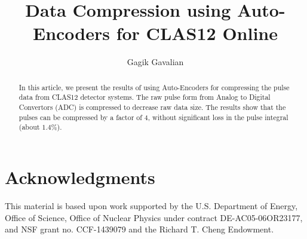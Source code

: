 \documentclass[preprint,12pt]{elsarticle}
\title{Data Compression using Auto-Encoders for CLAS12 Online}
\author[1]{Gagik Gavalian}
\begin{document}
\begin{abstract}
In this article, we present the results of using Auto-Encoders for compressing the pulse data from CLAS12 detector systems.
The raw pulse form from Analog to Digital Convertors (ADC) is compressed to decrease raw data size. The results show that the pulses
can be compressed by a factor of 4, without significant loss in the pulse integral (about $1.4\%$).
\end{abstract}
\maketitle









\section{Acknowledgments}

This material is based upon work supported by the U.S. Department of Energy, Office of Science,
Office of Nuclear Physics under contract DE-AC05-06OR23177, and NSF grant no. CCF-1439079 and
the Richard T. Cheng Endowment. 
 


\end{document}
